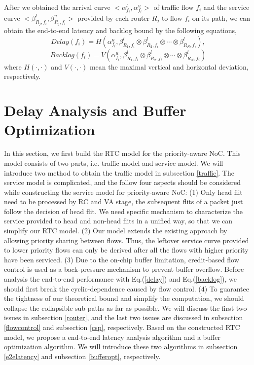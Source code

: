 \documentclass[10pt,journal]{IEEEtran}
\begin{document}
After we obtained the arrival curve $<\alpha^l_{f_i},\alpha^u_{f_i}>$ of traffic flow $f_i$ and the service curve $<\beta_{R_j,f_i}^l,\beta_{R_j,f_i}^u>$ provided by each router $R_j$ to flow $f_i$ on its path, we can obtain the end-to-end latency and backlog bound by the following equations,
\begin{equation}\label{delay}
Delay(f_i)=H(\alpha^u_{f_i},\beta^l_{R_1,f_i}\otimes\beta^l_{R_2,f_i}\otimes\cdots\otimes\beta^l_{R_N,f_i}),
\end{equation}
\begin{equation}\label{backlog}
Backlog(f_i)=V(\alpha^u_{f_i},\beta^l_{R_1,f_i}\otimes\beta^l_{R_2,f_i}\otimes\cdots\otimes\beta^l_{R_N,f_i})
\end{equation}
where $H(\cdot,\cdot)$ and $V(\cdot,\cdot)$ mean the maximal vertical and horizontal deviation, respectively.

\section{Delay Analysis and Buffer Optimization}\label{modeling}
In this section, we first build the RTC model for the priority-aware NoC. This model consists of two parts, i.e. traffic model and service model. We will introduce two method to obtain the traffic model in subsection \ref{traffic}. The service model is complicated, and the follow four aspects should be considered while constructing the service model for priority-aware NoC: (1) Only head flit need to be processed by RC and VA stage, the subsequent flits of a packet just follow the decision of head flit. We need specific mechanism to characterize the service provided to head and non-head flits in a unified way, so that we can simplify our RTC model. (2) Our model extends the existing approach \cite{73}\cite{Qian489900} by allowing priority sharing between flows. Thus, the leftover service curve provided to lower priority flows can only be derived after all the flows with higher priority have been serviced. (3) Due to the on-chip buffer limitation, credit-based flow control is used as a back-pressure mechanism to prevent buffer overflow. Before analysis the end-to-end performance with Eq.(\ref{delay}) and Eq.(\ref{backlog}), we should first break the cyclic-dependence caused by flow control. (4) To guarantee the tightness of our theoretical bound and simplify the computation, we should collapse the collapsible sub-paths as far as possible. We will discuss the first two issues in subsection \ref{router}, and the last two issues are discussed in subsection \ref{flowcontrol} and subsection \ref{csp}, respectively. Based on the constructed RTC model, we propose a end-to-end latency analysis algorithm and a buffer optimization algorithm. We will introduce these two algorithms in subsection \ref{e2elatency} and subsection \ref{bufferopt}, respectively.
\end{document}
